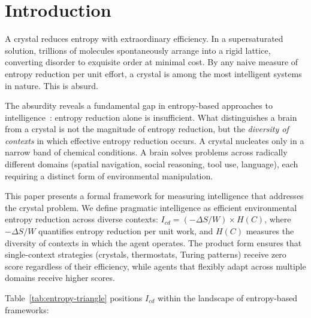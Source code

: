 \documentclass[runningheads,a4paper]{llncs}
\begin{document}

\section{Introduction}
\label{sec:intro}

A crystal reduces entropy with extraordinary efficiency. In a supersaturated solution, trillions of molecules spontaneously arrange into a rigid lattice, converting disorder to exquisite order at minimal cost. By any naive measure of entropy reduction per unit effort, a crystal is among the most intelligent systems in nature. This is absurd.

The absurdity reveals a fundamental gap in entropy-based approaches to intelligence~\cite{wissner2013causal,friston2010free,kolchinsky2018semantic}: entropy reduction alone is insufficient. What distinguishes a brain from a crystal is not the magnitude of entropy reduction, but the \emph{diversity of contexts} in which effective entropy reduction occurs. A crystal nucleates only in a narrow band of chemical conditions. A brain solves problems across radically different domains (spatial navigation, social reasoning, tool use, language), each requiring a distinct form of environmental manipulation.

This paper presents a formal framework for measuring intelligence that addresses the crystal problem. We define pragmatic intelligence as efficient environmental entropy reduction across diverse contexts: $I_{cd} = (-\Delta S / W) \times H(C)$, where $-\Delta S / W$ quantifies entropy reduction per unit work, and $H(C)$ measures the diversity of contexts in which the agent operates. The product form ensures that single-context strategies (crystals, thermostats, Turing patterns) receive zero score regardless of their efficiency, while agents that flexibly adapt across multiple domains receive higher scores.

Table~\ref{tab:entropy-triangle} positions $I_{cd}$ within the landscape of entropy-based frameworks:
\end{document}
